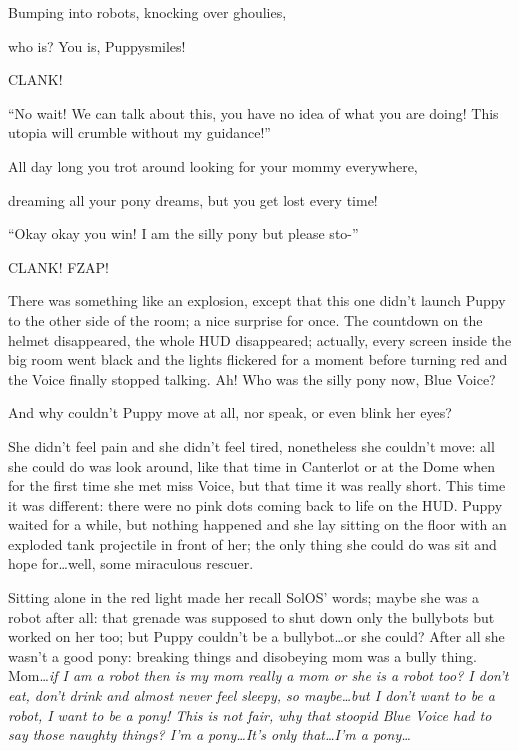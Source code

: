 \begin{song}
Bumping into robots, knocking over ghoulies,

who is? You is, Puppysmiles!
\end{song}

CLANK!

``No wait! We can talk about this, you have no idea of what you are doing! This utopia will crumble without my guidance!''


\begin{song}
    All day long you trot around looking for your mommy everywhere,

    dreaming all your pony dreams, but you get lost every time!
\end{song}

``Okay okay you win! I am the silly pony but please sto-''

CLANK! FZAP!

There was something like an explosion, except that this one didn't launch Puppy to the other side of the room; a nice surprise for once. The countdown on the helmet disappeared, the whole HUD disappeared; actually, every screen inside the big room went black and the lights flickered for a moment before turning red and the Voice finally stopped talking. Ah! Who was the silly pony now, Blue Voice?

And why couldn't Puppy move at all, nor speak, or even blink her eyes?

She didn't feel pain and she didn't feel tired, nonetheless she couldn't move: all she could do was look around, like that time in Canterlot or at the Dome when for the first time she met miss Voice, but that time it was really short. This time it was different: there were no pink dots coming back to life on the HUD. Puppy waited for a while, but nothing happened and she lay sitting on the floor with an exploded tank projectile in front of her; the only thing she could do was sit and hope for\dots well, some miraculous rescuer.

Sitting alone in the red light made her recall SolOS' words; maybe she was a robot after all: that grenade was supposed to shut down only the bullybots but worked on her too; but Puppy couldn't be a bullybot\dots or she could? After all she wasn't a good pony: breaking things and disobeying mom was a bully thing. Mom\dots \emph{if I am a robot then is my mom really a mom or she is a robot too? I don't eat, don't drink and almost never feel sleepy, so maybe\dots but I don't want to be a robot, I want to be a pony! This is not fair, why that stoopid Blue Voice had to say those naughty things? I'm a pony\dots It's only that\dots I'm a pony\dots}

